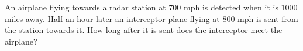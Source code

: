 An airplane flying towards a radar station at $700$ mph is detected when it is $1000$ miles away. Half an hour later an interceptor plane flying at $800$ mph is sent from the station towards it. How long after it is sent does the interceptor meet the airplane?

